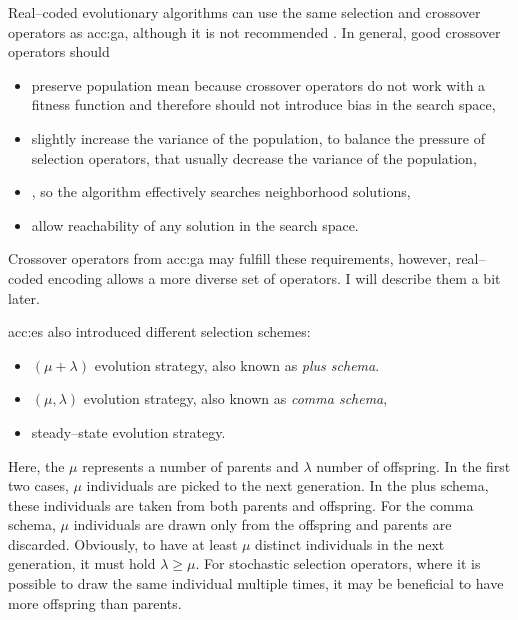 Real--coded evolutionary algorithms can use the same selection and crossover operators as \acrshort{acc:ga}, although it is not recommended \citet{IntroductionToEA}. In general, good crossover operators should
\begin{itemize}
    \item preserve population mean because crossover operators do not work with a fitness function and therefore should not introduce bias in the search space,
    \item slightly increase the variance of the population, to balance the pressure of selection operators, that usually decrease the variance of the population,
    \item\label{enum:espopulationvariance} \snipescondition, so the algorithm effectively searches neighborhood solutions,
    \item allow reachability of any solution in the search space.
\end{itemize}
Crossover operators from \acrshort{acc:ga} may fulfill these requirements, however, real--coded encoding allows a more diverse set of operators. I will describe them a bit later.

\acrshort{acc:es} also introduced different selection schemes:
\begin{itemize}
    \item $\left(\mu+\lambda\right)$ evolution strategy, also known as \emph{plus schema}.
    \item  $\left(\mu,\lambda\right)$ evolution strategy, also known as \emph{comma schema},
    \item\label{enum:steadystate} steady--state evolution strategy.
\end{itemize}
Here, the $\mu$ represents a number of parents and $\lambda$ number of offspring. In the first two cases, $\mu$ individuals are picked to the next generation. In the plus schema, these individuals are taken from both parents and offspring. For the comma schema, $\mu$ individuals are drawn only from the offspring and parents are discarded. Obviously, to have at least $\mu$ distinct individuals in the next generation, it must hold $\lambda\geq\mu$. For stochastic selection operators, where it is possible to draw the same individual multiple times, it may be beneficial to have more offspring than parents.

